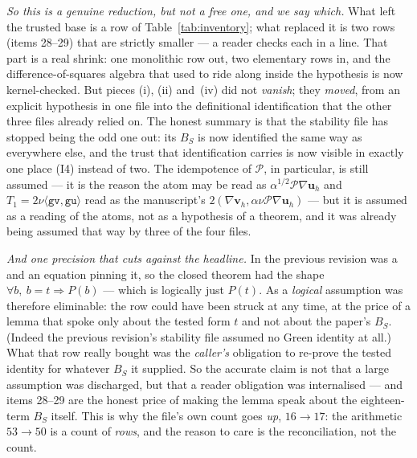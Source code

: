 \documentclass[11pt]{article}
\newcommand{\coq}[1]{\texttt{\detokenize{#1}}}
\begin{document}
\emph{So this is a genuine reduction, but not a free one, and we say which.} What
left the trusted base is a row of Table~\ref{tab:inventory}; what replaced it is
two rows (items 28--29) that are strictly smaller --- a reader checks each in a
line. That part is a real shrink: one monolithic row out, two elementary rows in,
and the difference-of-squares algebra that used to ride along inside the
hypothesis is now kernel-checked. But pieces (i), (ii) and~(iv) did not
\emph{vanish}; they \emph{moved}, from an explicit hypothesis in one file into
the definitional identification that the other three files already relied on.
The honest summary is that the stability file has stopped being the odd one out:
its $B_S$ is now identified the same way as everywhere else, and the trust that
identification carries is now visible in exactly one place (I4) instead of two.
The idempotence of $\mathcal P$, in particular, is still assumed --- it is the
reason the atom \coq{gu} may be read as $\alpha^{1/2}\mathcal P\nabla\mathbf u_h$
and $T_1=2\nu\langle\mathtt{gv},\mathtt{gu}\rangle$ read as the manuscript's
$2(\nabla\mathbf v_h,\alpha\nu\mathcal P\nabla\mathbf u_h)$ --- but it is assumed
as a reading of the atoms, not as a hypothesis of a theorem, and it was already
being assumed that way by three of the four files.

\emph{And one precision that cuts against the headline.} In the previous
revision \coq{BS} was a \coq{Variable} and \coq{HBS} an equation pinning it, so
the closed theorem had the shape $\forall b,\ b=t\Rightarrow P(b)$ --- which is
logically just $P(t)$. As a \emph{logical} assumption \coq{HBS} was therefore
eliminable: the row could have been struck at any time, at the price of a lemma
that spoke only about the tested form $t$ and not about the paper's $B_S$.
(Indeed the previous revision's stability file assumed no Green identity at
all.) What that row really bought was the \emph{caller's} obligation to re-prove
the tested identity for whatever $B_S$ it supplied. So the accurate claim is not
that a large assumption was discharged, but that a reader obligation was
internalised --- and items 28--29 are the honest price of making the lemma speak
about the eighteen-term $B_S$ itself. This is why the file's own count goes
\emph{up}, $16\to17$: the arithmetic $53\to50$ is a count of \emph{rows}, and
the reason to care is the reconciliation, not the count.
\end{document}
